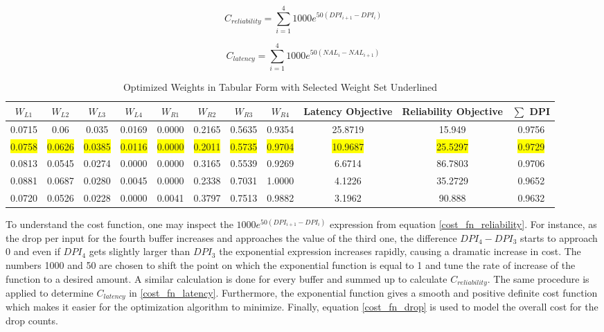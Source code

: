 \documentclass[journal,twoside]{IEEEtran}
\begin{document}
\begin{equation} \label{cost_fn_reliability}
C_{reliability} =  \sum_{i=1}^{4} 1000e^{50(DPI_{i+1}-DPI_{i})}
\end{equation}

\begin{equation} \label{cost_fn_latency}
C_{latency} =  \sum_{i=1}^{4} 1000e^{50(NAL_{i}-NAL_{i+1})}
\end{equation}

\begin{table}[ht]
\begin{tabular}{cccc|cccc||ccc}
\toprule 
$\displaystyle W_{L1}$ & $\displaystyle W_{L2}$ & $\displaystyle W_{L3}$ & $\displaystyle W_{L4}$ & $\displaystyle W_{R1}$ & $\displaystyle W_{R2}$ & $\displaystyle W_{R3}$ & $\displaystyle W_{R4}$ &  Latency Objective  &  Reliability Objective  & $\sum$ DPI \\
\midrule 
 0.0715 & 0.06 & 0.035 & 0.0169 & 0.0000 & 0.2165 & 0.5635 & 0.9354 & 25.8719 & 15.949 & 0.9756 \\
\colorbox{yellow}{0.0758} & \colorbox{yellow}{0.0626} & \colorbox{yellow}{0.0385} & \colorbox{yellow}{0.0116} & \colorbox{yellow}{0.0000} & \colorbox{yellow}{0.2011} & \colorbox{yellow}{0.5735} & \colorbox{yellow}{0.9704} & \colorbox{yellow}{10.9687} & \colorbox{yellow}{25.5297} & \colorbox{yellow}{0.9729}\\
0.0813 & 0.0545 & 0.0274 & 0.0000 & 0.0000 & 0.3165 & 0.5539 & 0.9269 & 6.6714 & 86.7803 & 0.9706 \\
0.0881 & 0.0687 & 0.0280 & 0.0045 & 0.0000 & 0.2338 & 0.7031 & 1.0000 & 4.1226 & 35.2729 & 0.9652 \\
0.0720 & 0.0526 & 0.0228 & 0.0000 & 0.0041 & 0.3797 & 0.7513 & 0.9882 & 3.1962 & 90.888 & 0.9632 \\
 \bottomrule
\end{tabular}
\caption{Optimized Weights in Tabular Form with Selected Weight Set Underlined}
\label{opt_weigths}
\end{table}

To understand the cost function, one may inspect the $1000e^{50(DPI_{i+1}-DPI_{i})}$ expression from equation \ref{cost_fn_reliability}. For instance, as the drop per input for the fourth buffer increases and approaches the value of the third one, the difference $DPI_{4}-DPI_{3}$ starts to approach 0 and even if $DPI_{4}$ gets slightly larger than $DPI_{3}$ the exponential expression increases rapidly, causing a dramatic increase in cost.
The numbers 1000 and 50 are chosen to shift the point on which the exponential function is equal to 1 and tune the rate of increase of the function to a desired amount. A similar calculation is done for every buffer and summed up to calculate $C_{reliability}$. The same procedure is applied to determine $C_{latency}$ in \ref{cost_fn_latency}. Furthermore, the exponential function gives a smooth and positive definite cost function which makes it easier for the optimization algorithm to minimize. Finally, equation \ref{cost_fn_drop} is used to model the overall cost for the drop counts.
\end{document}
